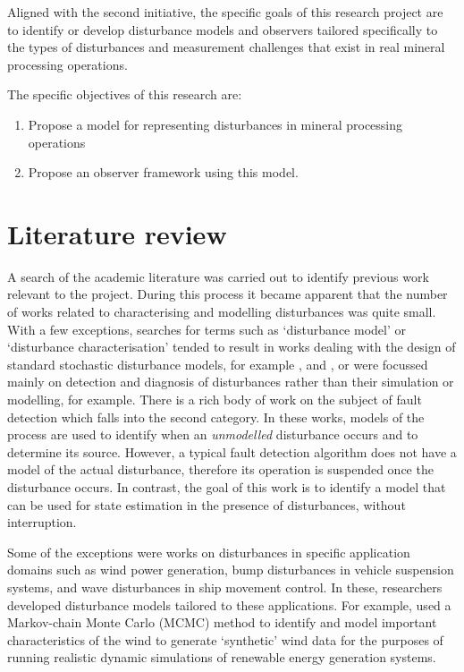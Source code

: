 Aligned with the second initiative, the specific goals of this research project are to identify or develop disturbance models and observers tailored specifically to the types of disturbances and measurement challenges that exist in real mineral processing operations.

The specific objectives of this research are:

\begin{enumerate}
	\item Propose a model for representing disturbances in mineral processing operations
	\item Propose an observer framework using this model.
\end{enumerate}

\section*{Literature review}

A search of the academic literature was carried out to identify previous work relevant to the project. During this process it became apparent that the number of works related to characterising and modelling disturbances was quite small. With a few exceptions, searches for terms such as `disturbance model' or `disturbance characterisation' tended to result in works dealing with the design of standard stochastic disturbance models, for example \cite{muske_disturbance_2002}, and \cite{pannocchia_robust_2003}, or were focussed mainly on detection and diagnosis of disturbances rather than their simulation or modelling, \cite{thornhill_advances_2007} for example. There is a rich body of work on the subject of fault detection which falls into the second category. In these works, models of the process are used to identify when an \textit{unmodelled} disturbance occurs and to determine its source. However, a typical fault detection algorithm does not have a model of the actual disturbance, therefore its operation is suspended once the disturbance occurs. In contrast, the goal of this work is to identify a model that can be used for state estimation in the presence of disturbances, without interruption.

Some of the exceptions were works on disturbances in specific application domains such as wind power generation, bump disturbances in vehicle suspension systems, and wave disturbances in ship movement control.  In these, researchers developed disturbance models tailored to these applications. For example, \cite{papaefthymiou_mcmc_2008} used a Markov-chain Monte Carlo (MCMC) method to identify and model important characteristics of the wind to generate `synthetic' wind data for the purposes of running realistic dynamic simulations of renewable energy generation systems.

